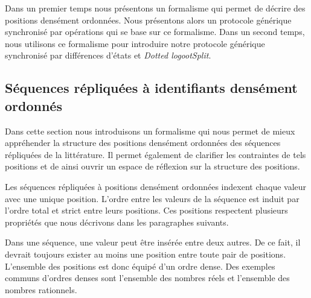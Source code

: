 Dans un premier temps nous présentons un formalisme qui permet de décrire des positions densément ordonnées.
Nous présentons alors un protocole générique synchronisé par opérations qui se base sur ce formalisme.
Dans un second temps, nous utilisons ce formalisme pour introduire notre protocole générique synchronisé par différences d'états et \emph{Dotted logootSplit}.

%


\subsection{Séquences répliquées à identifiants densément ordonnés}\label{subsec:dense-id-seq}

Dans cette section nous introduisons un formalisme qui nous permet de mieux appréhender la structure des positions densément ordonnées des séquences répliquées de la littérature.
Il permet également de clarifier les contraintes de tels positions et de ainsi ouvrir un espace de réflexion sur la structure des positions.

Les séquences répliquées à positions densément ordonnées indexent chaque valeur avec une unique position.
L'ordre entre les valeurs de la séquence est induit par l'ordre total et strict entre leurs positions.
Ces positions respectent plusieurs propriétés que nous décrivons dans les paragraphes suivants.

Dans une séquence, une valeur peut être insérée entre deux autres.
De ce fait, il devrait toujours exister au moins une position entre toute pair de positions.
L'ensemble des positions est donc équipé d'un ordre dense.
Des exemples communs d'ordres denses sont l'ensemble des nombres réels et l'ensemble des nombres rationnels.

